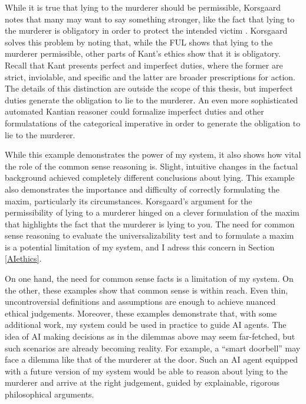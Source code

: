 \begin{isabellebody}
\begin{isamarkuptext}
{While it is true that lying to the murderer should be permissible, Korsgaard notes that many may want
to say something stronger, like the fact that lying to the murderer is obligatory in order to protect
the intended victim \citep[15]{KorsgaardRTL}. Korsgaard solves this problem by 
noting that, while the FUL shows that lying to the murderer permissible, other parts of Kant's ethics
show that it is obligatory. Recall that Kant presents perfect and imperfect duties,
where the former are strict, inviolable, and specific and the latter are broader prescriptions for action.
The details of this distinction are outside the scope of this thesis, but imperfect duties generate 
the obligation to lie to the murderer. An even more sophisticated automated Kantian reasoner could formalize 
imperfect duties and other formulatations of the categorical imperative in order to generate the 
obligation to lie to the murderer.}

While this example demonstrates the power of my system, it
also shows how vital the role of the common sense reasoning is. Slight, intuitive changes in the factual
background achieved completely different conclusions about lying. This example also demonstrates the importance
and difficulty of correctly formulating the maxim, particularly its circumstances.
Korsgaard's argument for the permissibility of lying to a 
murderer hinged on a clever formulation of the maxim that highlights the fact that the murderer is lying to you.
The need for common sense reasoning to evaluate the universalizability test and to formulate a maxim
is a potential limitation of my system, and I adress this concern in Section \ref{AIethics}.

On one hand, the need for common sense facts is a 
limitation of my system. On the other, these examples show that common sense is within reach. Even thin, 
uncontroversial definitions and assumptions are enough to achieve nuanced ethical judgements. Moreover, 
these examples demonstrate that, with some additional work, my system could be used in practice 
to guide AI agents. The idea of AI making decisions as in the dilemmas above may seem far-fetched, but
such scenarios are already becoming reality. For example, a ``smart doorbell'' may face a dilemma like that of
the murderer at the door. Such an AI agent equipped with a future version of my 
system would be able to reason about lying to the murderer and arrive at the right judgement, guided by
explainable, rigorous philosophical arguments.%
\end{isamarkuptext}\isamarkuptrue%
%
\isadelimtheory
%
\endisadelimtheory
%
\isatagtheory
%
\endisatagtheory
{\isafoldtheory}%
%
\isadelimtheory
%
\endisadelimtheory
%
\end{isabellebody}%

